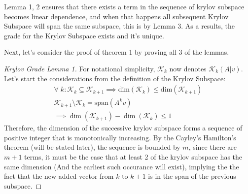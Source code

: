 \documentclass[]{article}
\theoremstyle{definition}
\begin{document}
            Lemma 1, 2 ensures that there exists a term in the sequence of krylov subspace becomes linear dependence, and when that happens all subsequent Krylov Subspace will span the same subspace, this is by Lemma 3. As a results, the grade for the Krylov Subspace exists and it's unique. 
            \par
            Next, let's consider the proof of theorem 1 by proving all 3 of the lemmas. 
            \begin{proof}[Krylov Grade Lemma 1]
                For notational simplicity, $\mathcal K_k$ now denotes $\mathcal K_k(A|v)$. Let's start the considerations from the definition of the Krylov Subspace: 
                \begin{align}
                    \forall\; k: \mathcal K_k \subseteq \mathcal K_{k + 1}\implies \text{dim}(\mathcal K_{k})\le \text{dim}(\mathcal K_{k + 1})
                    \\
                    \mathcal K_{k + 1}\setminus \mathcal K_k = \text{span}(A^{k}v) 
                    \\
                    \implies \dim(\mathcal K_{k + 1}) - \dim(\mathcal K_k) \le 1
                \end{align}
                Therefore, the dimension of the successive krylov subspace forms a sequence of positive integer that is monotonically increasing. By the Cayley's Hamilton's theorem (will be stated later), the sequence is bounded by $m$, since there are $m + 1$ terms, it must be the case that at least 2 of the krylov subspace has the same dimension (And the earliest such occurance will exist), implying the the fact that the new added vector from $k$ to $k + 1$ is in the span of the previous subspace. 
            \end{proof}
\end{document}
